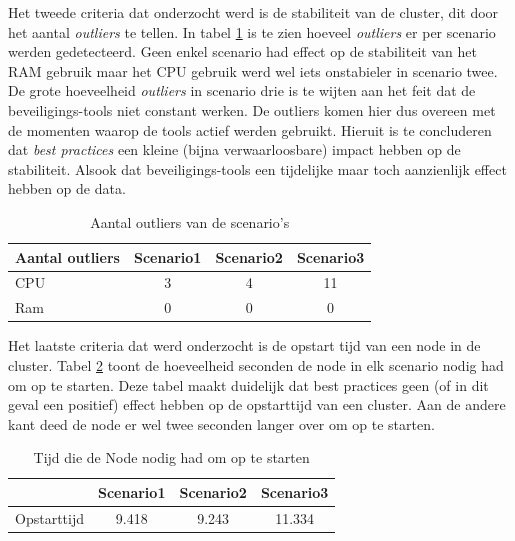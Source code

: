 Het tweede criteria dat onderzocht werd is de stabiliteit van de cluster, dit door het aantal \textit{outliers} te tellen. In tabel \ref{tab:Outliers} is te zien hoeveel \textit{outliers} er per scenario werden gedetecteerd. Geen enkel scenario had effect op de stabiliteit van het RAM gebruik maar het CPU gebruik werd wel iets onstabieler in scenario twee. De grote hoeveelheid \textit{outliers} in scenario drie is te wijten aan het feit dat de beveiligings-tools niet constant werken. De outliers komen hier dus overeen met de momenten waarop de tools actief werden gebruikt. Hieruit is te concluderen dat \textit{best practices} een kleine (bijna verwaarloosbare) impact hebben op de stabiliteit. Alsook dat beveiligings-tools een tijdelijke maar toch aanzienlijk effect hebben op de data.
%
\begin{table}[h]
	\centering
	\begin{tabular}{lccc}
		Aantal outliers & Scenario1 & Scenario2 & Scenario3 \\ \hline
		CPU             & 3         & 4         & 11        \\ \hline
		Ram             & 0         & 0         & 0        
	\end{tabular}
	\caption{Aantal outliers van de scenario's}
	\label{tab:Outliers}
\end{table}

Het laatste criteria dat werd onderzocht is de opstart tijd van een node in de cluster. Tabel \ref{tab:BootTime} toont de hoeveelheid seconden de node in elk scenario nodig had om op te starten. Deze tabel maakt duidelijk dat best practices geen (of in dit geval een positief) effect hebben op de opstarttijd van een cluster. Aan de andere kant deed de node er wel twee seconden langer over om op te starten. 

\begin{table}[h]
	\centering
	\begin{tabular}{lccc}
		& Scenario1 & Scenario2 & Scenario3 \\ \hline
		Opstarttijd & 9.418     & 9.243     & 11.334   
	\end{tabular}
	\caption{Tijd die de Node nodig had om op te starten}
	\label{tab:BootTime}
\end{table}


